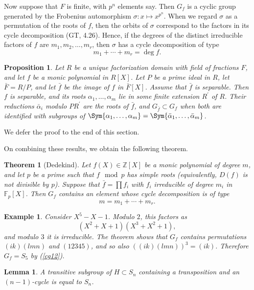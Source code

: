 \documentclass[a4paper,11pt,final,openany]{memoir}
\newtheorem{lemma}[X]{Lemma}
\newtheorem{proposition}[X]{Proposition}
\newtheorem{theorem}[X]{Theorem}
\newtheorem{example}[X]{Example}
\theoremstyle{nonumberplain}
\begin{document}
Now suppose that $F$ is finite, with $p^{n}$ elements say. Then $G_{f}$ is a
cyclic group generated by the Frobenius automorphism $\sigma\colon x\mapsto
x^{p^{n}}$. When we regard $\sigma$ as a permutation of the roots of $f$, then
the orbits of $\sigma$ correspond to the factors in its cycle decomposition
(GT, 4.26). Hence, if the degrees of the distinct irreducible factors
of $f$ are $m_{1},m_{2},\ldots,m_{r}$, then $\sigma$ has a cycle decomposition
of type
\[
m_{1}+\cdots+m_{r}=\deg f.
\]


\begin{proposition}
\label{cg20}Let $R$ be a unique factorization domain with field of fractions
$F$, and let $f$ be a monic polynomial in $R[X]$. Let $P$ be a prime ideal in
$R$, let $\bar{F}=R/P$, and let $\bar{f}$ be the image of $f$ in $\bar{F}[X]$.
Assume that $\bar{f}$ is separable. Then $f$ is separable, and its roots
$\alpha_{1},\ldots,\alpha_{m}$ lie in some finite extension $R^{\prime}$ of
$R$. Their reductions $\bar{\alpha}_{i}$ modulo $PR^{\prime}$ are the roots of
$\bar{f}$, and $G_{\bar{f}}\subset G_{f}$ when both are identified with
subgroups of $\Sym\{\alpha_{1},\ldots,\alpha_{m}\}=\Sym\{\bar{\alpha}%
_{1},\ldots,\bar{\alpha}_{m}\}$.
\end{proposition}

We defer the proof to the end of this section.

On combining these results, we obtain the following theorem.

\begin{theorem}
[Dedekind]\label{cg21}%
%
Let $f(X)\in\mathbb{Z}[X]$ be a monic polynomial of degree $m$, and let $p$ be
a prime such that $f\mod p$ has simple roots (equivalently, $D(f)$ is not
divisible by $p$). Suppose that $\bar{f}=\prod f_{i}$ with $f_{i}$ irreducible
of degree $m_{i}$ in $\mathbb{F}_{p}[X]$. Then $G_{f}$ contains an element
whose cycle decomposition is of type
\[
m=m_{1}+\cdots+m_{r}.
\]

\end{theorem}

\begin{example}
\label{cg22}Consider $X^{5}-X-1$. Modulo $2$, this factors as
\[
(X^{2}+X+1)(X^{3}+X^{2}+1),
\]
and modulo $3$ it is irreducible. The theorem shows that $G_{f}$ contains
permutations $(ik)(lmn)$ and $(12345)$, and so also $((ik)(lmn))^{3}=(ik)$.
Therefore $G_{f}=S_{5}$ by (\ref{cg12}).
\end{example}

\begin{lemma}
\label{cg23}A transitive subgroup of $H\subset S_{n}$ containing a
transposition and an $(n-1)$-cycle is equal to $S_{n}$.
\end{lemma}
\end{document}
